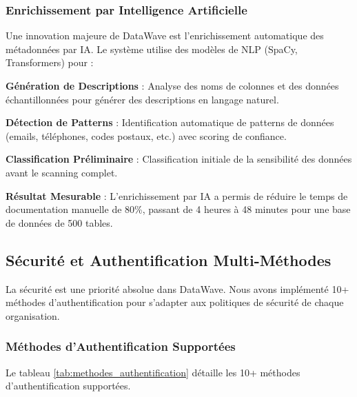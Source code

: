 \subsubsection{Enrichissement par Intelligence Artificielle}

Une innovation majeure de DataWave est l'enrichissement automatique des métadonnées par IA. Le système utilise des modèles de NLP (SpaCy, Transformers) pour :

\textbf{Génération de Descriptions} : Analyse des noms de colonnes et des données échantillonnées pour générer des descriptions en langage naturel.

\textbf{Détection de Patterns} : Identification automatique de patterns de données (emails, téléphones, codes postaux, etc.) avec scoring de confiance.

\textbf{Classification Préliminaire} : Classification initiale de la sensibilité des données avant le scanning complet.

\textbf{Résultat Mesurable} : L'enrichissement par IA a permis de réduire le temps de documentation manuelle de 80\%, passant de 4 heures à 48 minutes pour une base de données de 500 tables.

\subsection{Sécurité et Authentification Multi-Méthodes}

La sécurité est une priorité absolue dans DataWave. Nous avons implémenté 10+ méthodes d'authentification pour s'adapter aux politiques de sécurité de chaque organisation.

\subsubsection{Méthodes d'Authentification Supportées}

Le tableau \ref{tab:methodes_authentification} détaille les 10+ méthodes d'authentification supportées.

